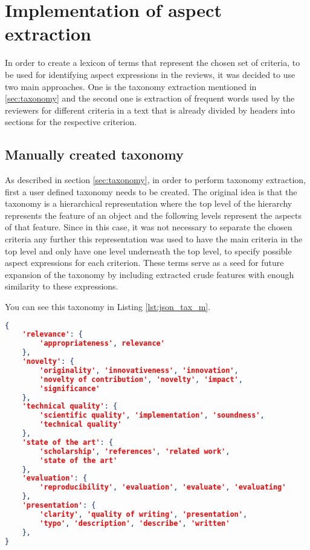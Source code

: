 \chapter{Implementation of aspect extraction}
\label{sec:ae}
In order to create a lexicon of terms that represent the chosen set of criteria, to be used for identifying aspect expressions in the reviews, it was decided to use two main approaches. One is the taxonomy extraction mentioned in \ref{sec:taxonomy} and the second one is extraction of frequent words used by the reviewers for different criteria in a text that is already divided by headers into sections for the respective criterion.
\section{Manually created taxonomy}
As described in section \ref{sec:taxonomy}, in order to perform taxonomy extraction, first a user defined taxonomy needs to be created.
The original idea is that the taxonomy is a hierarchical representation where the top level of the hierarchy represents the feature of an object and the following levels represent the aspects of that feature. Since in this case, it was not necessary to separate the chosen criteria any further this representation was used to have the main criteria in the top level and only have one level underneath the top level, to specify possible aspect expressions for each criterion. These terms serve as a seed for future expansion of the taxonomy by including extracted crude features with enough similarity to these expressions. 

You can see this taxonomy in Listing \ref{lst:json_tax_m}.

\begin{lstlisting}[language=json,firstnumber=1, caption={Manually created taxonomy for aspect extraction},label={lst:json_tax_m},float,floatplacement=H]
{
    'relevance': {
        'appropriateness', relevance'
    },
    'novelty': {
        'originality', 'innovativeness', 'innovation', 
        'novelty of contribution', 'novelty', 'impact', 
        'significance'
    },
    'technical quality': {
        'scientific quality', 'implementation', 'soundness',
        'technical quality'
    },
    'state of the art': {
        'scholarship', 'references', 'related work', 
        'state of the art'
    },
    'evaluation': {
    	'reproducibility', 'evaluation', 'evaluate', 'evaluating'
    },
    'presentation': {
    	'clarity', 'quality of writing', 'presentation',
    	'typo', 'description', 'describe', 'written'
    },
}
\end{lstlisting}


